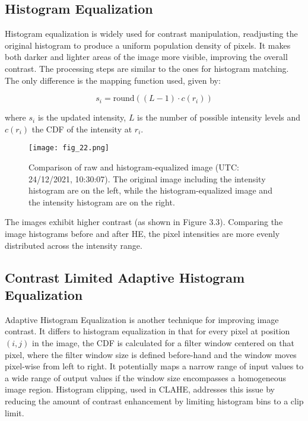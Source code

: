 \subsection{Histogram Equalization}

Histogram equalization is widely used for contrast manipulation, readjusting the original histogram to produce a uniform population density of pixels\cite{Ghosh2013}. It makes both darker and lighter areas of the image more visible, improving the overall contrast.
The processing steps are similar to the ones for histogram matching. The only difference is the mapping function used, given by\cite{Gonzalez2018}: 

\begin{equation}
s_i = \text{round} \left((L-1) \cdot c(r_i) \right)
\end{equation}

where \( s_i\) is the updated intensity, \( L\) is the number of possible intensity levels and \( c(r_i)\) the CDF of the intensity at \( r_i\).
\FloatBarrier
\begin{figure}[h!] 
    \centering
    \texttt{[image: fig\_22.png]}
    \caption{Comparison of raw and histogram-equalized image (UTC: 24/12/2021, 10:30:07). The original image including the intensity histogram are on the left, while the histogram-equalized image and the intensity histogram are on the right.}
\end{figure}
\FloatBarrier
The images exhibit higher contrast (as shown in Figure 3.3). Comparing the image histograms before and after HE, the pixel intensities are more evenly distributed across the intensity range.

\subsection{Contrast Limited Adaptive Histogram Equalization}

Adaptive Histogram Equalization is another technique for improving image contrast. It differs to histogram equalization in that for every pixel at position \( (i,j)\) in the image, the CDF is calculated for a filter window centered on that pixel, where the filter window size is defined before-hand and the window moves pixel-wise from left to right\cite{Haertinger2024}. It potentially maps a narrow range of input values to a wide range of output values if the window size encompasses a homogeneous image region. Histogram clipping, used in CLAHE, addresses this issue by reducing the amount of contrast enhancement by limiting histogram bins to a clip limit.

